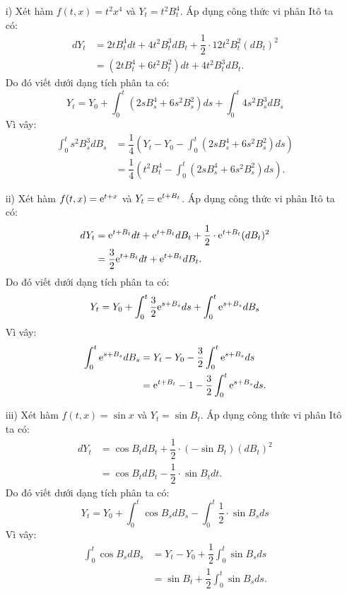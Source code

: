 \begin{sol*}
    \begin{itemize}
        \item[i)] Xét hàm $f(t,x)=t^2x^4$ và $Y_t=t^2 B_t^4$. Áp dụng công thức vi phân Itô ta có:
        \begin{align*}
            dY_t 
            &= 2t B_t^4 dt + 4t^2 B_t^3 dB_t + \dfrac{1}{2}\cdot 12t^2 B_t^2 (dB_t)^2 \\
            &= \left(2t B_t^4 + 6t^2 B_t^2\right)dt + 4t^2 B_t^3 dB_t.
        \end{align*}
        Do đó viết dưới dạng tích phân ta có:
        \[Y_t = Y_0 + \displaystyle \int_0^t \left(2s B_s^4 + 6s^2 B_s^2\right)ds + \displaystyle \int_0^t 4s^2 B_s^3 dB_s\]
        Vì vây:
        \begin{align*}
            \displaystyle \int_0^t s^2 B_s^3 dB_s 
            &= \dfrac{1}{4} \left(Y_t - Y_0 - \displaystyle \int_0^t (2s B_s^4 + 6s^2 B_s^2)ds \right)\\
            &= \dfrac{1}{4} \left(t^2 B_t^4 - \displaystyle \int_0^t \left(2s B_s^4 + 6s^2 B_s^2\right)ds \right).
        \end{align*}
        \item[ii)] Xét hàm $f(t,x)=\mathrm{e}^{t+x}$ và $Y_t= \mathrm{e}^{t+B_t} $. Áp dụng công thức vi phân Itô ta có:
        \begin{align*}
            dY_t 
            &= \mathrm{e}^{t+B_t} dt + \mathrm{e}^{t+B_t} dB_t + \dfrac{1}{2}\cdot \mathrm{e}^{t+B_t} (dB_t)^2 \\
            &= \dfrac{3}{2}\mathrm{e}^{t+B_t} dt + \mathrm{e}^{t+B_t} dB_t.
        \end{align*}
        Do đó viết dưới dạng tích phân ta có:
        \[Y_t = Y_0 + \displaystyle \int_0^t \dfrac{3}{2}\mathrm{e}^{s+B_s} ds + \displaystyle \int_0^t \mathrm{e}^{s+B_s} dB_s\]
        Vì vây:
        \begin{align*}
            \displaystyle \int_0^t \mathrm{e}^{s+B_s} dB_s 
            &= Y_t - Y_0 - \dfrac{3}{2}\displaystyle \int_0^t \mathrm{e}^{s+B_s} ds\\
            &= \mathrm{e}^{t+B_t} - 1 - \dfrac{3}{2}\displaystyle \int_0^t \mathrm{e}^{s+B_s} ds.
        \end{align*}
        \item[iii)] Xét hàm $f(t,x)=\sin  x$ và $Y_t=\sin B_t$. Áp dụng công thức vi phân Itô ta có:
        \begin{align*}
            dY_t 
            &= \cos B_t dB_t + \dfrac{1}{2}\cdot (-\sin B_t) (dB_t)^2 \\
            &= \cos B_t dB_t - \dfrac{1}{2}\cdot \sin B_t dt.
        \end{align*}
        Do đó viết dưới dạng tích phân ta có:
        \[Y_t = Y_0 + \displaystyle \int_0^t \cos B_s dB_s - \displaystyle \int_0^t \dfrac{1}{2}\cdot \sin B_s ds \]
        Vì vây:
        \begin{align*}
            \displaystyle \int_0^t \cos B_s dB_s &= Y_t - Y_0 + \dfrac{1}{2} \displaystyle \int_0^t \sin B_sds \\
            &= \sin B_t + \dfrac{1}{2} \displaystyle \int_0^t \sin B_sds.
        \end{align*}
    \end{itemize}
\end{sol*}
